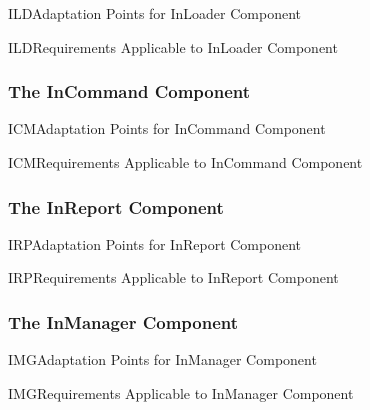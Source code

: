 \documentclass{pnp_article}
\begin{document}
\begin{crAp}{ILD}{Adaptation Points for InLoader Component}
\end{crAp}

\begin{crReq}{ILD}{Requirements Applicable to InLoader Component}
\end{crReq}

\subsubsection{The InCommand Component}\label{sec:InCommand}


\begin{crAp}{ICM}{Adaptation Points for InCommand Component}
\end{crAp}

\begin{crReq}{ICM}{Requirements Applicable to InCommand Component}
\end{crReq}

\subsubsection{The InReport Component}\label{sec:InReport}


\begin{crAp}{IRP}{Adaptation Points for InReport Component}
\end{crAp}

\begin{crReq}{IRP}{Requirements Applicable to InReport Component}
\end{crReq}

\subsubsection{The InManager Component}\label{sec:InManager}


\begin{crAp}{IMG}{Adaptation Points for InManager Component}
\end{crAp}

\begin{crReq}{IMG}{Requirements Applicable to InManager Component}
\end{crReq}
\end{document}
